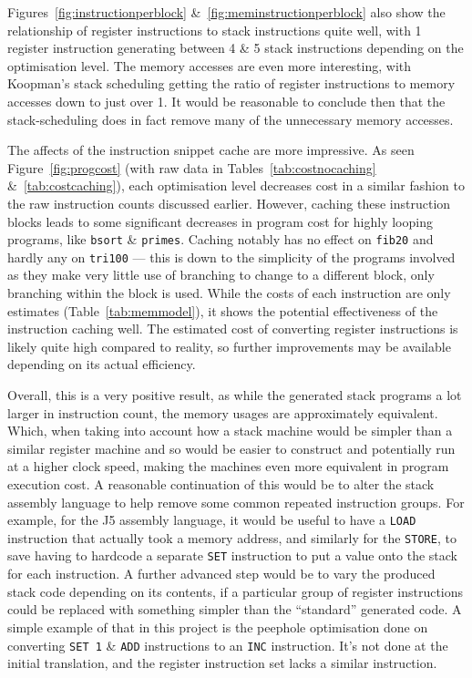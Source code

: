 Figures~\ref{fig:instructionperblock} \&~\ref{fig:meminstructionperblock} also
show the relationship of register instructions to stack instructions quite well,
with 1 register instruction generating between 4 \& 5 stack instructions
depending on the optimisation level. The memory accesses are even more
interesting, with Koopman's stack scheduling getting the ratio of register
instructions to memory accesses down to just over 1. It would be reasonable to
conclude then that the stack-scheduling does in fact remove many of the
unnecessary memory accesses.

The affects of the instruction snippet cache are more impressive. As seen
Figure~\ref{fig:progcost} (with raw data in Tables~\ref{tab:costnocaching}
\&~\ref{tab:costcaching}), each optimisation level decreases cost in a similar
fashion to the raw instruction counts discussed earlier. However, caching these
instruction blocks leads to some significant decreases in program cost for
highly looping programs, like \texttt{bsort} \& \texttt{primes}. Caching notably
has no effect on \texttt{fib20} and hardly any on \texttt{tri100} --- this is
down to the simplicity of the programs involved as they make very little use of
branching to change to a different block, only branching within the block is
used. While the costs of each instruction are only estimates
(Table~\ref{tab:memmodel}), it shows the potential effectiveness of the
instruction caching well. The estimated cost of converting register instructions
is likely quite high compared to reality, so further improvements may be
available depending on its actual efficiency.

Overall, this is a very positive result, as while the generated stack programs a
lot larger in instruction count, the memory usages are approximately equivalent.
Which, when taking into account how a stack machine would be simpler than a
similar register machine and so would be easier to construct and potentially run
at a higher clock speed, making the machines even more equivalent in program
execution cost. A reasonable continuation of this would be to alter the stack
assembly language to help remove some common repeated instruction groups. For
example, for the J5 assembly language, it would be useful to have a
\texttt{LOAD} instruction that actually took a memory address, and similarly for
the \texttt{STORE}, to save having to hardcode a separate \texttt{SET}
instruction to put a value onto the stack for each instruction. A further
advanced step would be to vary the produced stack code depending on its
contents, if a particular group of register instructions could be replaced with
something simpler than the ``standard'' generated code. A simple example of that
in this project is the peephole optimisation done on converting \texttt{SET 1}
\& \texttt{ADD} instructions to an \texttt{INC} instruction. It's not done at
the initial translation, and the register instruction set lacks a similar
instruction.

